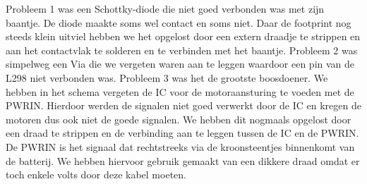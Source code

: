 Probleem 1 was een Schottky-diode die niet goed verbonden was met zijn baantje. De diode maakte soms wel contact en soms niet. Daar de footprint nog steeds klein uitviel hebben we het opgelost door een extern draadje te strippen en aan het contactvlak te solderen en te verbinden met het baantje.
Probleem 2 was simpelweg een Via die we vergeten waren aan te leggen waardoor een pin van de L298 niet verbonden was. 
Probleem 3 was het de grootste boosdoener. We hebben in het schema vergeten de IC voor de motoraansturing te voeden met de PWRIN. Hierdoor werden de signalen niet goed verwerkt door de IC en kregen de motoren dus ook niet de goede signalen. We hebben dit nogmaals opgelost door een draad te strippen en de verbinding aan te leggen tussen de IC en de PWRIN. De PWRIN is het signaal dat rechtstreeks via de kroonsteentjes binnenkomt van de batterij. We hebben hiervoor gebruik gemaakt van een dikkere draad omdat er toch enkele volts door deze kabel moeten. 




